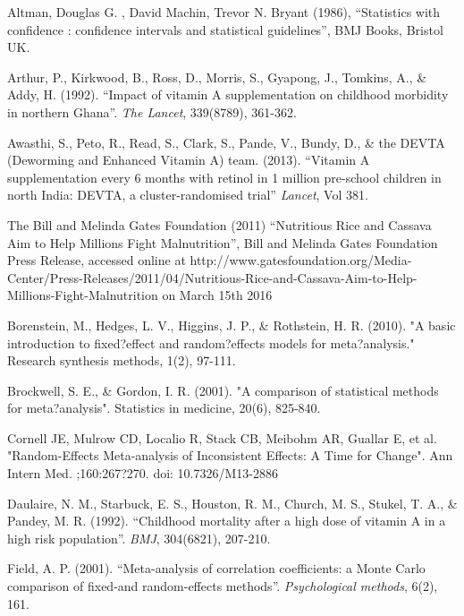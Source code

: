 \documentclass[12pt]{article}
\begin{document}
\clearpage

\begin{thebibliography}{99}

\bibitem Altman,  Douglas G. , David Machin, Trevor N. Bryant (1986), ``Statistics with confidence : confidence intervals and statistical guidelines'', BMJ Books, Bristol UK. 

\bibitem Arthur, P., Kirkwood, B., Ross, D., Morris, S., Gyapong, J., Tomkins, A., \& Addy, H. (1992). ``Impact of vitamin A supplementation on childhood morbidity in northern Ghana''. \emph{The Lancet}, 339(8789), 361-362.

\bibitem Awasthi, S., Peto, R., Read, S., Clark, S., Pande, V., Bundy, D., \& the DEVTA (Deworming and Enhanced Vitamin A) team. (2013). ``Vitamin A supplementation every 6 months with retinol in 1 million pre-school children in north India: DEVTA, a cluster-randomised trial'' \emph{Lancet}, Vol 381.

 The Bill and Melinda Gates Foundation (2011) ``Nutritious Rice and Cassava Aim to Help Millions Fight Malnutrition'', Bill and Melinda Gates Foundation Press Release, accessed online at http://www.gatesfoundation.org/Media-Center/Press-Releases/2011/04/Nutritious-Rice-and-Cassava-Aim-to-Help-Millions-Fight-Malnutrition on March 15th 2016 

 Borenstein, M., Hedges, L. V., Higgins, J. P., \& Rothstein, H. R. (2010). "A basic introduction to fixed?effect and random?effects models for meta?analysis." Research synthesis methods, 1(2), 97-111.

 Brockwell, S. E., \& Gordon, I. R. (2001). "A comparison of statistical methods for meta?analysis". Statistics in medicine, 20(6), 825-840.

 Cornell JE, Mulrow CD, Localio R, Stack CB, Meibohm AR, Guallar E, et al. "Random-Effects Meta-analysis of Inconsistent Effects: A Time for Change". Ann Intern Med. ;160:267?270. doi: 10.7326/M13-2886

 Daulaire, N. M., Starbuck, E. S., Houston, R. M., Church, M. S., Stukel, T. A., \& Pandey, M. R. (1992). ``Childhood mortality after a high dose of vitamin A in a high risk population''. \emph{BMJ}, 304(6821), 207-210.

\bibitem Field, A. P. (2001). ``Meta-analysis of correlation coefficients: a Monte Carlo comparison of fixed-and random-effects methods''. \emph{Psychological methods}, 6(2), 161.


\end{thebibliography}
\end{document}
